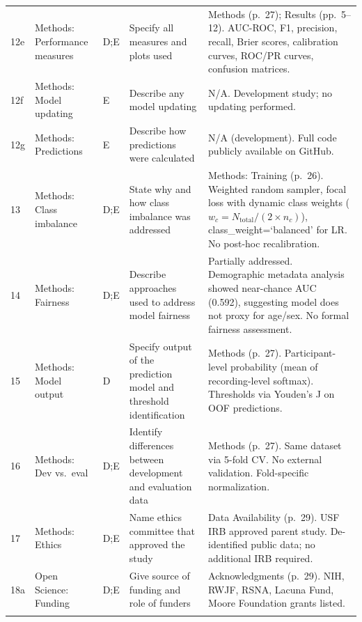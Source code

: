 \documentclass[11pt,a4paper]{article}
\begin{document}
{\begin{longtable}{C{0.6cm} L{2.2cm} C{0.6cm} L{5.5cm} L{4.5cm}}
12e & Methods: Performance measures & D;E & Specify all measures and plots used & Methods (p.~27); Results (pp.~5--12). AUC-ROC, F1, precision, recall, Brier scores, calibration curves, ROC/PR curves, confusion matrices. \\
\addlinespace

12f & Methods: Model updating & E & Describe any model updating & N/A. Development study; no updating performed. \\
\addlinespace

12g & Methods: Predictions & E & Describe how predictions were calculated & N/A (development). Full code publicly available on GitHub. \\
\addlinespace

13 & Methods: Class imbalance & D;E & State why and how class imbalance was addressed & Methods: Training (p.~26). Weighted random sampler, focal loss with dynamic class weights ($w_c = N_{\text{total}} / (2 \times n_c)$), class\_weight=`balanced' for LR. No post-hoc recalibration. \\
\addlinespace

14 & Methods: Fairness & D;E & Describe approaches used to address model fairness & Partially addressed. Demographic metadata analysis showed near-chance AUC (0.592), suggesting model does not proxy for age/sex. No formal fairness assessment. \\
\addlinespace

15 & Methods: Model output & D & Specify output of the prediction model and threshold identification & Methods (p.~27). Participant-level probability (mean of recording-level softmax). Thresholds via Youden's J on OOF predictions. \\
\addlinespace

16 & Methods: Dev vs.\ eval & D;E & Identify differences between development and evaluation data & Methods (p.~27). Same dataset via 5-fold CV. No external validation. Fold-specific normalization. \\
\addlinespace

17 & Methods: Ethics & D;E & Name ethics committee that approved the study & Data Availability (p.~29). USF IRB approved parent study. De-identified public data; no additional IRB required. \\
\addlinespace

18a & Open Science: Funding & D;E & Give source of funding and role of funders & Acknowledgments (p.~29). NIH, RWJF, RSNA, Lacuna Fund, Moore Foundation grants listed. \\
\addlinespace


\end{longtable}}
\end{document}
